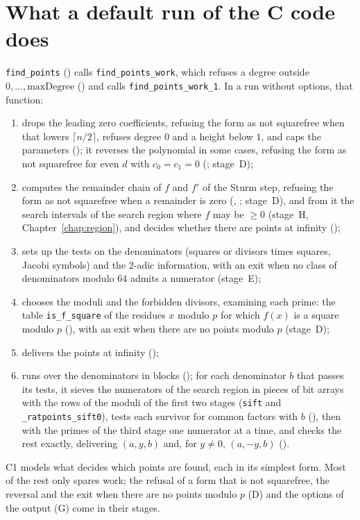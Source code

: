 \section{What a default run of the C code does}\label{sec:skeleton}

\verb|find_points| () calls \verb|find_points_work|, which
refuses a degree outside $0, \dots, \mathrm{maxDegree}$ () and
calls
\verb|find_points_work_1|. In a run without options, that function:
\begin{enumerate}
  \item drops the leading zero coefficients, refusing the form as not squarefree when that lowers
    $\lceil n/2 \rceil$, refuses degree $0$ and a height below $1$, and caps the parameters
    (); it reverses the polynomial in some cases, refusing the
    form as not squarefree for even $d$ with $c_0 = c_1 = 0$ (;
    stage~D);
  \item computes the remainder chain of $f$ and $f'$ of the Sturm step, refusing the form as not
    squarefree when a remainder is zero (,
    ; stage~D), and from it the search intervals of the search
    region where $f$ may be $\ge 0$ (stage~H, Chapter~\ref{chap:region}), and decides whether there
    are points at infinity ();
  \item sets up the tests on the denominators (squares or divisors times squares, Jacobi symbols)
    and the 2-adic information, with an exit when no class of denominators modulo $64$ admits a
    numerator (stage~E);
  \item chooses the moduli and the forbidden divisors, examining each prime: the table
    \verb|is_f_square| of the residues $x$ modulo $p$ for which $f(x)$ is a square modulo $p$
    (), with an exit when there are no points modulo $p$
    (stage~D);
  \item delivers the points at infinity ();
  \item runs over the denominators in blocks (); for each
    denominator $b$ that passes its tests, it sieves the numerators of the search region in pieces
    of bit arrays with the rows of the moduli of the first two stages (\verb|sift| and
    \verb|_ratpoints_sift0|), tests each survivor for common factors with $b$
    (), then with the primes of the third stage one numerator at a time,
    and checks the rest exactly, delivering $(a, y, b)$ and, for $y \ne 0$, $(a, -y, b)$
    ().
\end{enumerate}
C1 models what decides which points are found, each in its simplest form. Most of the rest only
spares work; the refusal of a form that is not squarefree, the reversal and the exit when there
are no points modulo $p$ (D) and the options of the output (G) come in their stages.

